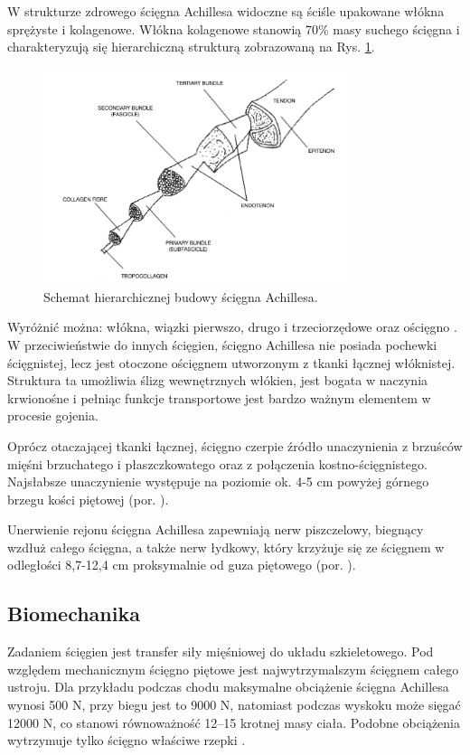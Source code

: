 W strukturze zdrowego ścięgna Achillesa widoczne są ściśle upakowane włókna sprężyste i kolagenowe. Włókna kolagenowe stanowią 70\% masy suchego ścięgna i charakteryzują się hierarchiczną strukturą zobrazowaną na Rys. \ref{Achilles-histology}.  
\begin{figure}[h!]
	\centering
	\includegraphics[width=0.8\textwidth]{figures/Achilles_hist.png}
	\caption{Schemat hierarchicznej budowy ścięgna Achillesa.}
	\label{Achilles-histology}
\end{figure}

Wyróżnić można: włókna, wiązki pierwszo, drugo i trzeciorzędowe oraz ościęgno \cite{Sharma2006}. W przeciwieństwie do innych ścięgien, ścięgno Achillesa nie posiada pochewki ścięgnistej, lecz jest otoczone ościęgnem utworzonym z tkanki łącznej włóknistej. Struktura ta umożliwia ślizg wewnętrznych włókien, jest bogata w naczynia krwionośne i pełniąc funkcje transportowe jest bardzo ważnym elementem w procesie gojenia. 

Oprócz otaczającej tkanki łącznej, ścięgno czerpie źródło unaczynienia z brzuśców mięśni brzuchatego i płaszczkowatego oraz z połączenia kostno-ścięgnistego. Najsłabsze unaczynienie występuje na poziomie ok. 4-5 cm powyżej górnego brzegu kości piętowej (por. \cite{bochenek2016anatomia}).

Unerwienie rejonu ścięgna Achillesa zapewniają nerw piszczelowy, biegnący wzdłuż całego ścięgna, a także nerw łydkowy, który krzyżuje się ze ścięgnem w odległości 8,7-12,4 cm proksymalnie od guza piętowego (por. \cite{bochenek2016anatomia}). 

\subsection{Biomechanika}
\label{Biomechanika}
Zadaniem ścięgien jest transfer siły mięśniowej do układu szkieletowego. Pod względem mechanicznym ścięgno piętowe jest najwytrzymalszym ścięgnem całego ustroju. Dla przykładu podczas chodu maksymalne obciążenie ścięgna Achillesa wynosi 500 N, przy biegu jest to 9000 N, natomiast podczas wyskoku może sięgać 12000 N, co stanowi równoważność 12--15 krotnej masy ciała. Podobne obciążenia wytrzymuje tylko ścięgno właściwe rzepki \cite{Etiologia}.

